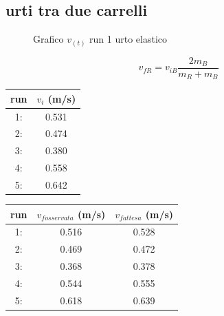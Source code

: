\documentclass[a4paper]{article}
\theoremstyle{definition}
\begin{document}
\subsection*{urti tra due carrelli}

\begin{figure}[!ht]
	\captionsetup{labelformat=empty}
	\caption{Grafico \(v_{(t)}\) run 1 urto elastico}
	
\end{figure}
\[v_{f R} = v_{i B} \frac{2 m_{B}}{m_{R}+m_{B}}\]
\begin{minipage}[c]{0.5\textwidth}
	\captionsetup{labelformat=empty}
	\centering
	\begin{tabular}{||cc||}
		\hline
		\hline
		run &  \(v_{i}\) (m/s)\\
		\hline
		1: & 0.531  \\ 
		2: & 0.474\\
		3: & 0.380\\
		4: & 0.558\\
		5: & 0.642\\
		\hline
		\hline
	\end{tabular}
	
\end{minipage}
\begin{minipage}[c]{0.5\textwidth}
	\captionsetup{labelformat=empty}
	\centering
	\begin{tabular}{||ccc||}
		\hline
		\hline
		run &  \(v_{fosservata}\) (m/s) & \(v_{fattesa}\) (m/s)\\
		\hline
		1: & 0.516 & 0.528 \\
		2: & 0.469& 0.472\\
		3: & 0.368& 0.378\\
		4: & 0.544& 0.555\\
		5: & 0.618& 0.639\\
		\hline
		\hline
	\end{tabular}
\end{minipage}
\end{document}
